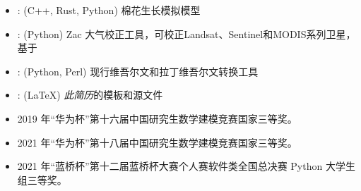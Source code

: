 \documentclass[zh]{resume}
\begin{document}
\begin{itemize}
  \item {}:
    (C++, Rust, Python)
    棉花生长模拟模型
  \item {}:
    (Python)
    Zac 大气校正工具，可校正Landsat、Sentinel和MODIS系列卫星，基于
  \item {}:
    (Python, Perl) 现行维吾尔文和拉丁维吾尔文转换工具
  \item {}:
    (\LaTeX)
    \emph{此简历}的模板和源文件
\end{itemize}

\begin{itemize}
  \item 2019 年“华为杯”第十六届中国研究生数学建模竞赛国家三等奖。
  \item 2021 年“华为杯”第十八届中国研究生数学建模竞赛国家三等奖。
  \item 2021 年“蓝桥杯”第十二届蓝桥杯大赛个人赛软件类全国总决赛 Python 大学生组三等奖。
\end{itemize}
\end{document}
